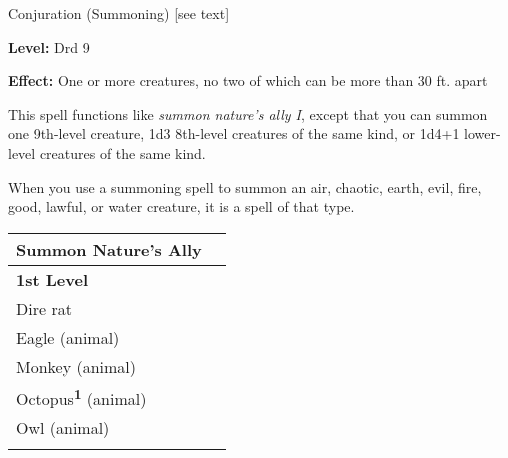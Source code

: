 
Conjuration (Summoning) [see text]

\textbf{Level:} Drd 9

\textbf{Effect:} One or more creatures, no two of which can be more than 30 ft. 
apart

This spell functions like \textit{summon nature's ally I}, except that you can 
summon one 9th-level creature, 1d3 8th-level creatures of the same kind, or 1d4+1 
lower-level creatures of the same kind.

When you use a summoning spell to summon an air, chaotic, earth, evil, fire, good, 
lawful, or water creature, it is a spell of that type.

\begin{longtable}{ll}
\hline
\multicolumn{1}{|p{3.788in}|}{\begin{minipage}[t]{3.788in}\raggedright
\textbf{Summon Nature's Ally}\end{minipage}}\\
\hline
\multicolumn{1}{p{0.069in}|}{\begin{minipage}[t]{0.069in}\raggedright
\textbf{1st Level}\end{minipage}}\\
\hline
\multicolumn{1}{|p{3.788in}|}{\begin{minipage}[t]{3.788in}\raggedright
Dire rat\end{minipage}}\\
\hline
\multicolumn{1}{p{0.069in}|}{\begin{minipage}[t]{0.069in}\raggedright
Eagle (animal)\end{minipage}}\\
\hline
\multicolumn{2}{|p{3.857in}|}{\begin{minipage}[t]{3.857in}\raggedright
Monkey (animal)\end{minipage}}\\
\hline
\multicolumn{1}{p{0.069in}|}{\begin{minipage}[t]{0.069in}\raggedright
Octopus\textsuperscript{\textbf{1}}\textbf{} (animal)\end{minipage}}\\
\hline
\multicolumn{2}{|p{3.857in}|}{\begin{minipage}[t]{3.857in}\raggedright
Owl (animal)\end{minipage}}\\
\hline
\multicolumn{2}{|p{3.857in}|}{\begin{minipage}[t]{3.857in}\raggedright

\end{minipage}}
\end{longtable}
